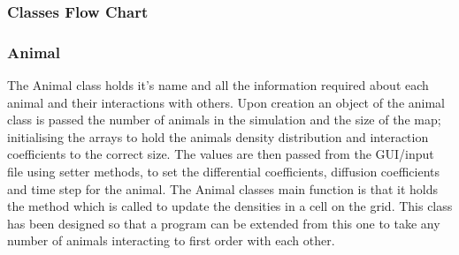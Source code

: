\documentclass[11pt]{report}
\begin{document}
\subsubsection{Classes Flow Chart}

\subsubsection{Animal}
\label{sec:Animal}
The Animal class holds it's name and all the information required about each animal and their interactions with others. Upon creation an object of the animal class is passed the number of animals in the simulation and the size of the map; initialising the arrays to hold the animals density distribution and interaction coefficients to the correct size. The values are then passed from the GUI/input file using setter methods, to set the differential coefficients, diffusion coefficients and time step for the animal. The Animal classes main function is that it holds the method which is called to update the densities in a cell on the grid. This class has been designed so that a program can be extended from this one to take any number of animals interacting to first order with each other.
\end{document}
